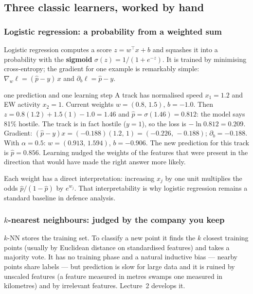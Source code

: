 \documentclass[11pt]{article}
\begin{document}
\subsection{Three classic learners, worked by hand}
\subsubsection{Logistic regression: a probability from a weighted sum}
Logistic regression computes a score $z=w^\top x+b$ and squashes it into a probability with the \textbf{sigmoid} $\sigma(z)=1/(1+e^{-z})$. It is trained by minimising cross-entropy; the gradient for one example is remarkably simple: $\nabla_w\ell=(\hat p-y)\,x$ and $\partial_b\ell=\hat p-y$.
\begin{example}{one prediction and one learning step}
A track has normalised speed $x_1=1.2$ and EW activity $x_2=1$. Current weights $w=(0.8,\,1.5)$, $b=-1.0$. Then $z=0.8(1.2)+1.5(1)-1.0=1.46$ and $\hat p=\sigma(1.46)=0.812$: the model says 81\% hostile. The track is in fact hostile ($y=1$), so the loss is $-\ln0.812=0.209$.\\
Gradient: $(\hat p-y)x=(-0.188)(1.2,\,1)=(-0.226,\,-0.188)$; $\partial_b=-0.188$. With $\alpha=0.5$: $w=(0.913,\,1.594)$, $b=-0.906$. The new prediction for this track is $\hat p=0.856$. Learning nudged the weights of the features that were present in the direction that would have made the right answer more likely.
\end{example}
Each weight has a direct interpretation: increasing $x_j$ by one unit multiplies the odds $\hat p/(1-\hat p)$ by $e^{w_j}$. That interpretability is why logistic regression remains a standard baseline in defence analysis.

\subsubsection{$k$-nearest neighbours: judged by the company you keep}
$k$-NN stores the training set. To classify a new point it finds the $k$ closest training points (usually by Euclidean distance on standardised features) and takes a majority vote. It has no training phase and a natural inductive bias --- nearby points share labels --- but prediction is slow for large data and it is ruined by unscaled features (a feature measured in metres swamps one measured in kilometres) and by irrelevant features. Lecture~2 develops it.
\end{document}
